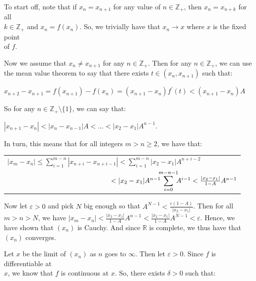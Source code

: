 \documentclass{book}
\newcommand{\pracTwo}{
   \color{Orange}%
   \fontsize{12}{14}\selectfont%
}
\newenvironment{myIndent}{%
   \begin{adjustwidth}{2.5em}{0em}%
}{%
   \end{adjustwidth}%
}
\newcommand{\retTwo}{\hfill\bigbreak}
\begin{document}
{\begin{myIndent}\pracTwo
   To start off, note that if $x_n = x_{n+1}$ for any value of $n \in \mathbb{Z}_+$, then $x_n = x_{n+k}$ for all\\ $k \in \mathbb{Z}_+$ and $x_n = f(x_n)$. So, we trivially have that $x_n \rightarrow x$ where $x$ is the fixed point\\ of $f$.\retTwo
   
   Now we assume that $x_n \neq x_{n+1}$ for any $n \in \mathbb{Z}_+$. Then for any $n \in \mathbb{Z}_+$, we can use\\ the mean value theorem to say that there exists $t \in (x_n, x_{n+1})$ such that:

   {\center $x_{n+2} - x_{n+1} = f(x_{n+1}) - f(x_n) = (x_{n+1} - x_n)f^\prime(t) < (x_{n+1} - x_n)A$\retTwo\par}

   So for any $n \in \mathbb{Z}_+ \setminus \{1\}$, we can say that:

   {\center $|x_{n+1} - x_{n}| < |x_{n} - x_{n-1}|A < \ldots < |x_{2} - x_1|A^{n-1}$.\retTwo\par}

   In turn, this means that for all integers $m > n \geq 2$, we have that:

   {\center 
   \begin{tabular}{l}
      $|x_{m} - x_{n}| \leq \sum\limits_{i=1}^{m-n}|x_{n+i} - x_{n+i-1}| < \sum\limits_{i=1}^{m-n}|x_2 - x_1|A^{n+i-2}$\\
      $\phantom{|x_{n+k} - x_{n}| \leq \sum\limits_{i=1}^{k}|x_{n+i} - x_{n+i-1}|} < |x_2 - x_1|A^{n-1}\hspace{-0.3em}{\displaystyle\sum\limits_{i=0}^{m-n-1}}\hspace{-0.3em}{A^{i-1}} < \frac{|x_2 - x_1|}{1 - A}A^{n-1}$
   \end{tabular}\retTwo\par}

   Now let $\varepsilon > 0$ and pick $N$ big enough so that $A^{N-1} < \frac{\varepsilon(1 - A)}{|x_2 - x_1|}$. Then for all\\ $m > n > N$, we have $|x_m - x_n| < \frac{|x_2 - x_1|}{1 - A}A^{n-1} < \frac{|x_2 - x_1|}{1 - A}A^{N-1} < \varepsilon$. Hence, we\\ have shown that $(x_n)$ is Cauchy. And since $\mathbb{R}$ is complete, we thus have that\\ $(x_n)$ converges.
   
   \newpage

   Let $x$ be the limit of $(x_n)$ as $n$ goes to $\infty$. Then let $\varepsilon > 0$. Since $f$ is differentiable at\\ $x$, we know that $f$ is continuous at $x$. So, there exists $\delta > 0$ such that:


\end{myIndent}}
\end{document}
